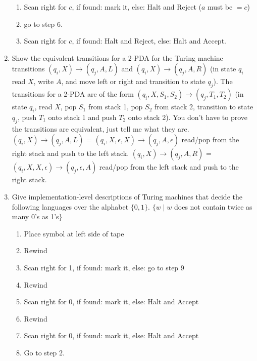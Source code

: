 \documentclass{article}
\begin{document}
\begin{enumerate}
\begin{enumerate}[label = (\arabic*)]
            \item Scan right for $c$, if found: mark it, else: Halt and Reject ($a$ must be $= c$)
            \item go to step 6.
            \item Scan right for $c$, if found: Halt and Reject, else: Halt and Accept.
        \end{enumerate}
        \item Show the equivalent transitions for a 2-PDA for the 
        Turing machine transitions $(q_i, X) \rightarrow (q_j, A, L)$ and $(q_i, X) \rightarrow 
        (q_j, A, R)$ (in state $q_i$ read $X$, write $A$, and move left or right and transition to 
        state $q_j$). The transitions for a 2-PDA are of the form $(q_i, X, S_1, S_2) \rightarrow
        (q_j, T_1, T_2)$ (in state $q_i$, read $X$, pop $S_1$ from stack 1, pop $S_2$ from stack 2, 
        transition to state $q_j$, push $T_1$ onto stack 1 and push $T_2$ onto stack 2). You don't 
        have to prove the transitions are equivalent, just tell me what they are.\newline\newline
        $(q_i, X) \rightarrow (q_j, A, L)$ = $(q_i, X, \epsilon, X) \rightarrow (q_j, A, \epsilon)$
        read/pop from the right stack and push to the left stack.\newline
        $(q_i, X) \rightarrow (q_j, A, R)$ = $(q_i, X, X, \epsilon) \rightarrow (q_j, \epsilon, A)$
        read/pop from the left stack and push to the right stack.
        \item Give implementation-level descriptions of Turing machines that decide the following 
        languages over the alphabet $\{0,1\}$. $\{w\mid w $ does not contain twice as many 0's as 
        1's$\}$
        \begin{enumerate}[label=(\arabic*)]
            \item Place symbol at left side of tape
            \item Rewind            
            \item Scan right for 1, if found: mark it, else: go to step 9
            \item Rewind
            \item Scan right for 0, if found: mark it, else: Halt and Accept
            \item Rewind
            \item Scan right for 0, if found: mark it, else: Halt and Accept
            \item Go to step 2.

\end{enumerate}
\end{enumerate}
\end{document}
